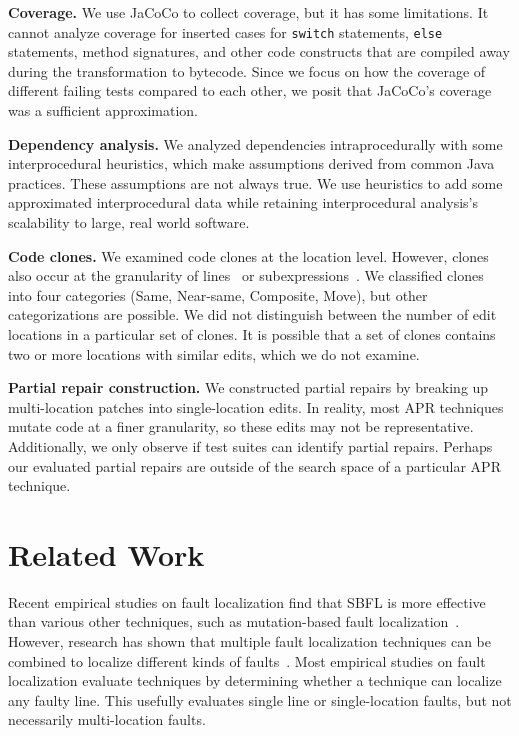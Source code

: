 \documentclass[10pt,journal,compsoc]{IEEEtran}
\begin{document}
\vspace{1ex}
\noindent\textbf{Coverage.}
We use JaCoCo to collect coverage, but it has some
limitations. It cannot analyze coverage for inserted
cases for \texttt{switch} statements, \texttt{else} statements, method
signatures, and other code constructs that are compiled away during the
transformation to bytecode. Since we focus on how the coverage of different
failing tests compared to each other, we posit that JaCoCo's coverage was a
sufficient approximation.

\vspace{1ex}
\noindent\textbf{Dependency analysis.}
We analyzed dependencies intraprocedurally with some interprocedural 
heuristics, which make assumptions derived from common Java practices.
These assumptions are not always true. We use heuristics to add some
approximated interprocedural data while retaining interprocedural 
analysis's scalability to large, real world software.

\vspace{1ex}
\noindent\textbf{Code clones.}
We examined code clones at the location level.  However, clones also occur at the
granularity of lines~\cite{JiaClones} or
subexpressions~\cite{microclones}. We classified clones into four
categories (Same, Near-same, Composite, Move), but other categorizations 
are possible.
%
We did not distinguish between the number
of edit locations in a particular set of clones. It is possible that a set of
clones contains two or more locations with similar edits, which we do not examine. 

\vspace{1ex}
\noindent\textbf{Partial repair construction.}
We constructed partial repairs by breaking up multi-location patches
into single-location edits.
In reality, most APR techniques mutate code at a finer granularity, so
these edits may not be representative.  Additionally, we only observe if test suites
can identify partial repairs. Perhaps our evaluated partial repairs
are outside of the search space of a
particular APR technique.

\section{Related Work}
\label{sec:related}

Recent empirical studies on fault localization find that 
SBFL is more effective than various other techniques, such as 
mutation-based fault localization~\cite{pearson2017evaluating, mut-analysis}.
However, research has shown that multiple fault localization techniques can be
combined to localize different kinds of faults~\cite{zou2019empirical}. Most
empirical studies on fault localization evaluate techniques by determining
whether a technique can localize any faulty line. This usefully evaluates single
line or single-location faults, but not necessarily multi-location faults.
\end{document}
